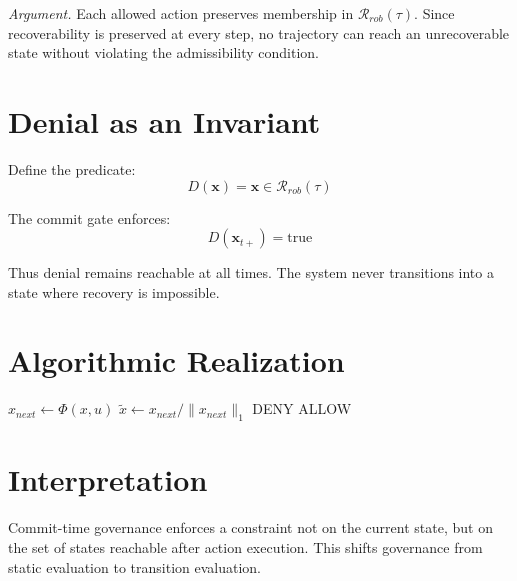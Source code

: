 \documentclass[letterpaper, 10 pt, conference]{ieeeconf}
\begin{document}
\textit{Argument.}
Each allowed action preserves membership in $\mathcal{R}_{rob}(\tau)$. Since recoverability is preserved at every step, no trajectory can reach an unrecoverable state without violating the admissibility condition.

\section{Denial as an Invariant}

Define the predicate:
\begin{equation}
D(\mathbf{x}) = \mathbf{x} \in \mathcal{R}_{rob}(\tau)
\end{equation}

The commit gate enforces:
\begin{equation}
D(\mathbf{x}_{t+}) = \text{true}
\end{equation}

Thus denial remains reachable at all times. The system never transitions into a state where recovery is impossible.

\section{Algorithmic Realization}

\begin{algorithm}
\caption{Commit-Time ALLOW Gate}
\begin{algorithmic}[1]
\State $x_{next} \gets \Phi(x, u)$
\State $\tilde{x} \gets x_{next} / \|x_{next}\|_1$
    \State \Return DENY
\EndIf
\State \Return ALLOW
\end{algorithmic}
\end{algorithm}

\section{Interpretation}

Commit-time governance enforces a constraint not on the current state, but on the set of states reachable after action execution. This shifts governance from static evaluation to transition evaluation.

\end{document}
